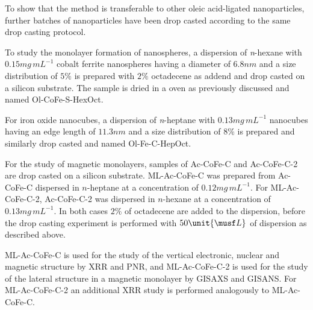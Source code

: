 \documentclass[\main/dresen_thesis.tex]{subfiles}
\begin{document}
      To show that the method is transferable to other oleic acid-ligated nanoparticles, further batches of nanoparticles have been drop casted according to the same drop casting protocol.

      To study the monolayer formation of nanospheres, a dispersion of \textit{n}-hexane with $0.15 \unit{mg \, mL^{-1}}$ cobalt ferrite nanospheres having a diameter of $6.8 \unit{nm}$ and a size distribution of $5 \unit{\%}$ is prepared with $2 \unit{\%}$ octadecene as addend and drop casted on a silicon substrate.
      The sample is dried in a oven as previously discussed and named Ol-CoFe-S-HexOct.

      For iron oxide nanocubes, a dispersion of \textit{n}-heptane with $0.13 \unit{mg \, mL^{-1}}$ nanocubes having an edge length of $11.3 \unit{nm}$ and a size distribution of $8\unit{\%}$ is prepared and similarly drop casted and named Ol-Fe-C-HepOct.

      For the study of magnetic monolayers, samples of Ac-CoFe-C and Ac-CoFe-C-2 are drop casted on a silicon substrate.
      ML-Ac-CoFe-C was prepared from Ac-CoFe-C dispersed in $\mathit{n}$-heptane at a concentration of $0.12 \unit{mg \, mL^{-1}}$.
      For ML-Ac-CoFe-C-2, Ac-CoFe-C-2 was dispersed in $\mathit{n}$-hexane at a concentration of $0.13 \unit{mg \, mL^{-1}}$.
      In both cases $2 \unit{\%}$ of octadecene are added to the dispersion, before the drop casting experiment is performed with $50 \unit{\musf L}$ of dispersion as described above.

      ML-Ac-CoFe-C is used for the study of the vertical electronic, nuclear and magnetic structure by XRR and PNR, and ML-Ac-CoFe-C-2 is used for the study of the lateral structure in a magnetic monolayer by GISAXS and GISANS.
      For ML-Ac-CoFe-C-2 an additional XRR study is performed analogously to ML-Ac-CoFe-C.
\end{document}
